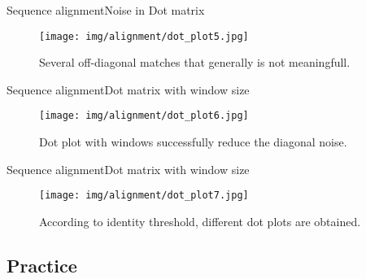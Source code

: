 \documentclass[10pt]{beamer}
\newcommand{\1}{
	\setbeamertemplate{background}{
		\texttt{[image: img/1]}
		\tikz[overlay] \fill[fill opacity=0.75,fill=white] (0,0) rectangle (-\paperwidth,\paperheight);
	}
}
\begin{document}

\begin{frame}{Sequence alignment}{Noise in Dot matrix}	
	\begin{figure}[]
		\centering
		\texttt{[image: img/alignment/dot\_plot5.jpg]}
		\label{img:uniprot}
		\caption{Several off-diagonal matches that generally is not meaningfull.}
	\end{figure}
\end{frame}

\begin{frame}{Sequence alignment}{Dot matrix with window size}	
	\begin{figure}[]
		\centering
		\texttt{[image: img/alignment/dot\_plot6.jpg]}
		\label{img:uniprot}
		\caption{Dot plot with windows successfully reduce the diagonal noise.}
	\end{figure}
\end{frame}

\begin{frame}{Sequence alignment}{Dot matrix with window size}	
	\begin{figure}[]
		\centering
		\texttt{[image: img/alignment/dot\_plot7.jpg]}
		\label{img:uniprot}
		\caption{According to identity threshold, different dot plots are obtained.}
	\end{figure}
\end{frame}

\subsection{Practice}                                 %
\end{document}
